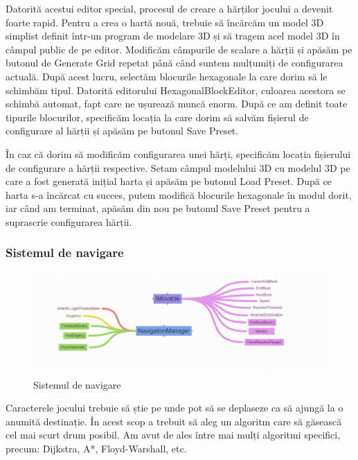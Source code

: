 \documentclass[12pt, a4paper]{article}
\begin{document}
	Datorită acestui editor special, procesul de creare a hărților jocului a devenit foarte rapid. Pentru a crea o hartă nouă, trebuie să încărcăm un model 3D simplist definit într-un program de modelare 3D și să tragem acel model 3D în câmpul public de pe editor. Modificăm câmpurile de scalare a hărții și apăsăm pe butonul de Generate Grid repetat până când suntem mulțumiți de configurarea actuală. După acest lucru, selectăm blocurile hexagonale la care dorim să le schimbăm tipul. Datorită editorului HexagonalBlockEditor, culoarea acestora se schimbă automat, fapt care ne ușurează muncă enorm. După ce am definit toate tipurile blocurilor, specificăm locația la care dorim să salvăm fișierul de configurare al hărții și apăsăm pe butonul Save Preset.
	\newline
	
	În caz că dorim să modificăm configurarea unei hărți, specificăm locația fișierului de configurare a hărții respective. Setam câmpul modelului 3D cu modelul 3D pe care a fost generată inițial harta și apăsăm pe butonul Load Preset. După ce harta s-a încărcat cu succes, putem modifică blocurile hexagonale în modul dorit, iar când am terminat, apăsăm din nou pe butonul Save Preset pentru a suprascrie configurarea hărții.
	\newline
	
	
	
	
	
	\subsubsection{Sistemul de navigare}

	\begin{figure}[H]
		\centering
		\includegraphics[width=1\textwidth]{navigationCoggle.png}
		\caption{Sistemul de navigare}
		\label{fig: navigationManager}
	\end{figure}

	Caracterele jocului trebuie să știe pe unde pot să se deplaseze ca să ajungă la o anumită destinație. În acest scop a trebuit să aleg un algoritm care să găsească cel mai scurt drum posibil. Am avut de ales între mai mulți algoritmi specifici, precum: Dijkstra, A*, Floyd-Warshall, etc.
	\newline
	
\end{document}
